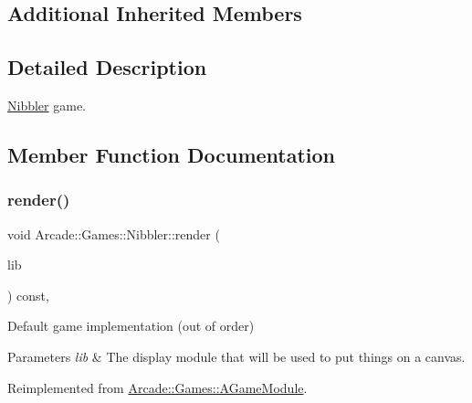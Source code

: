 \subsection*{Additional Inherited Members}


\subsection{Detailed Description}
\mbox{\hyperlink{classArcade_1_1Games_1_1Nibbler}{Nibbler}} game. 

\subsection{Member Function Documentation}
\mbox{\label{classArcade_1_1Games_1_1Nibbler_afd52ee2fad66523b58f94f9eb582145e}} 
\subsubsection{\texorpdfstring{render()}{render()}}
{\footnotesize\ttfamily void Arcade\+::\+Games\+::\+Nibbler\+::render (\begin{DoxyParamCaption}\item[{\mbox{\hyperlink{classArcade_1_1Display_1_1IDisplayModule}{Arcade\+::\+Display\+::\+I\+Display\+Module}} \&}]{lib }\end{DoxyParamCaption}) const\hspace{0.3cm}{\ttfamily [final]}, {\ttfamily [virtual]}}



Default game implementation (out of order) 


\begin{DoxyParams}{Parameters}
{\em lib} & The display module that will be used to put things on a canvas. \\
\hline
\end{DoxyParams}


Reimplemented from \mbox{\hyperlink{classArcade_1_1Games_1_1AGameModule_a5897780d42d5faba3287c29b87f2b498}{Arcade\+::\+Games\+::\+A\+Game\+Module}}.

\mbox{\label{classArcade_1_1Games_1_1Nibbler_a6a44a75ab1905647587d7a6314155955}} 
